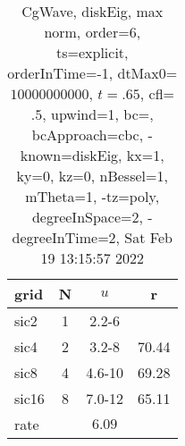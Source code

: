 \begin{table}[H]\tableFont %
\begin{center}
\begin{tabular}{|l|c|c|c|} \hline 
grid  & N &  $ u $ & r \\ \hline 
      sic2 &     1 & \num{2.2}{-6} &        \\ \hline
      sic4 &     2 & \num{3.2}{-8} & 70.44  \\ \hline
      sic8 &     4 & \num{4.6}{-10} & 69.28  \\ \hline
     sic16 &     8 & \num{7.0}{-12} & 65.11  \\ \hline
    rate             &       &  $6.09$       &       \\ \hline
\end{tabular}
\caption{CgWave, diskEig, max norm, order=$6$, ts=explicit, orderInTime=-1, dtMax0=$10000000000$, $t=.65$, cfl=$.5$, upwind=1, bc=, bcApproach=cbc, -known=diskEig, kx=1, ky=0, kz=0, nBessel=1, mTheta=1, -tz=poly, degreeInSpace=2, -degreeInTime=2, Sat Feb 19 13:15:57 2022}\label{table:diskEigOrder6max}
\end{center}
\end{table}
